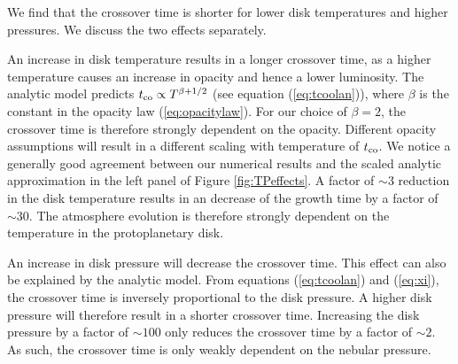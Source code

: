 \documentclass[apj]{emulateapj}
\newcommand{\cb}{_{\rm RCB}}
\begin{document}
We find that the crossover time is shorter for lower disk temperatures and higher pressures. We discuss the two effects separately.

An increase in disk temperature results in a longer crossover time, as a higher temperature causes an increase in opacity and hence a lower luminosity. The analytic model predicts $t_{\rm{co}} \propto T^{\beta+ 1/2}$ (see equation (\ref{eq:tcoolan})), where $\beta$ is the constant in the opacity law (\ref{eq:opacitylaw}). For our choice of $\beta=2$, the crossover time is therefore strongly dependent on the opacity. Different opacity assumptions will result in a different scaling with temperature of $t_{\rm{co}}$. We notice a generally good agreement between our numerical results and the scaled analytic approximation in the left panel of Figure \ref{fig:TPeffects}. A factor of $\sim 3$ reduction in the disk temperature results in an decrease of the growth time by a factor of $\sim 30$. The atmosphere evolution is therefore strongly dependent on the temperature in the protoplanetary disk.

An increase in disk pressure will decrease the crossover time. This effect can also be explained by the analytic model. From equations (\ref{eq:tcoolan}) and (\ref{eq:xi}), the crossover time is inversely proportional to the disk pressure. A higher disk pressure will therefore result in a shorter crossover time. Increasing the disk pressure by a factor of $\sim 100$ only reduces the crossover time by a factor of $\sim 2$. As such, the crossover time is only weakly dependent on the nebular pressure.




\end{document}
